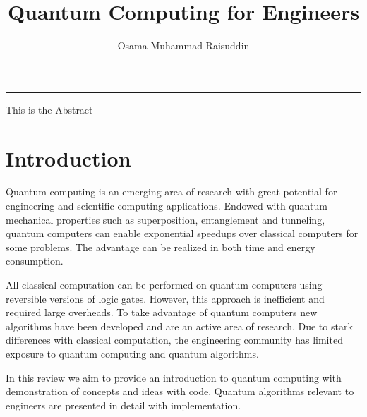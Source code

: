 \documentclass{article}
\title{Quantum Computing for Engineers}
\author{Osama Muhammad Raisuddin}
\begin{document}
\maketitle

\tableofcontents


  \vspace{10pt}
    \hrule
  \vspace{10pt}
This is the Abstract 
  \vspace{10pt}








\section{Introduction}


Quantum computing is an emerging area of research with great potential for engineering and scientific computing applications. Endowed with quantum mechanical properties such as superposition, entanglement and tunneling, quantum computers can enable exponential speedups over classical computers for some problems. The advantage can be realized in both time and energy consumption. 

All classical computation can be performed on quantum computers using reversible versions of logic gates. However, this approach is inefficient and required large overheads. To take advantage of quantum computers new algorithms have been developed and are an active area of research. Due to stark differences with classical computation, the engineering community has limited exposure to quantum computing and quantum algorithms. 

In this review we aim to provide an introduction to quantum computing with demonstration of concepts and ideas with code. Quantum algorithms relevant to engineers are presented in detail with implementation.
\end{document}
